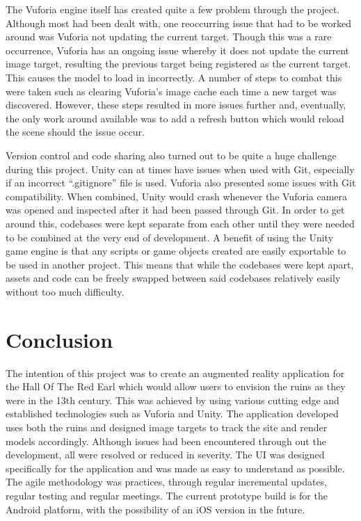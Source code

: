 The Vuforia engine itself has created quite a few problem through the project. Although most had been dealt with, one reoccurring issue that had to be worked around was Vuforia not updating the current target. Though this was a rare occurrence, Vuforia has an ongoing issue whereby it does not update the current image target, resulting the previous target being registered as the current target. This causes the model to load in incorrectly. A number of steps to combat this were taken such as clearing Vuforia's image cache each time a new target was discovered. However, these steps resulted in more issues further and, eventually, the only work around available was to add a refresh button which would reload the scene should the issue occur.

Version control and code sharing also turned out to be quite a huge challenge during this project. Unity can at times have issues when used with Git, especially if an incorrect “.gitignore” file is used. Vuforia also presented some issues with Git compatibility. When combined, Unity would crash whenever the Vuforia camera was opened and inspected after it had been passed through Git. In order to get around this, codebases were kept separate from each other until they were needed to be combined at the very end of development. A benefit of using the Unity game engine is that any scripts or game objects created are easily exportable to be used in another project. This means that while the codebases were kept apart, assets and code can be freely swapped between said codebases relatively easily without too much difficulty.

\chapter{Conclusion}
The intention of this project was to create an augmented reality application for the Hall Of The Red Earl which would allow users to envision the ruins as they were in the 13th century. This was achieved by using various cutting edge and established technologies such as Vuforia and Unity.
The application developed uses both the ruins and designed image targets to track the site and render models accordingly. Although issues had been encountered through out the development, all were resolved or reduced in severity. The UI was designed specifically for the application and was made as easy to understand as possible. The agile methodology was practices, through regular incremental updates, regular testing and regular meetings. The current prototype build is for the Android platform, with the possibility of an iOS version in the future.

